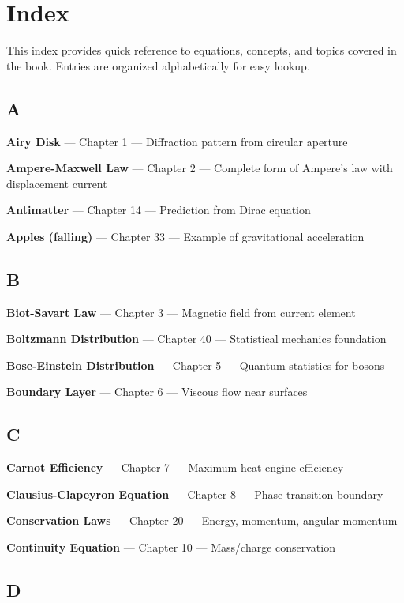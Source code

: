 \chapter{Index}

This index provides quick reference to equations, concepts, and topics covered in the book. Entries are organized alphabetically for easy lookup.

\section*{A}

\textbf{Airy Disk} --- Chapter 1 --- Diffraction pattern from circular aperture

\textbf{Ampere-Maxwell Law} --- Chapter 2 --- Complete form of Ampere's law with displacement current

\textbf{Antimatter} --- Chapter 14 --- Prediction from Dirac equation

\textbf{Apples (falling)} --- Chapter 33 --- Example of gravitational acceleration

\section*{B}

\textbf{Biot-Savart Law} --- Chapter 3 --- Magnetic field from current element

\textbf{Boltzmann Distribution} --- Chapter 40 --- Statistical mechanics foundation

\textbf{Bose-Einstein Distribution} --- Chapter 5 --- Quantum statistics for bosons

\textbf{Boundary Layer} --- Chapter 6 --- Viscous flow near surfaces

\section*{C}

\textbf{Carnot Efficiency} --- Chapter 7 --- Maximum heat engine efficiency

\textbf{Clausius-Clapeyron Equation} --- Chapter 8 --- Phase transition boundary

\textbf{Conservation Laws} --- Chapter 20 --- Energy, momentum, angular momentum

\textbf{Continuity Equation} --- Chapter 10 --- Mass/charge conservation

\section*{D}

